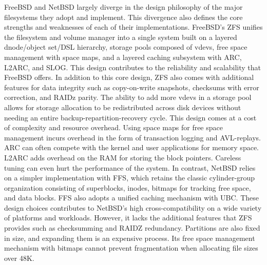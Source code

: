 FreeBSD and NetBSD largely diverge in the design philosophy of the major filesystems they adopt and implement. This divergence
also defines the core strengths and weaknesses of each of their implementations. FreeBSD's ZFS unifies the filesystem and volume
manager into a single system built on a layered dnode/object set/DSL hierarchy, storage pools composed of vdevs, free space
management with space maps, and a layered caching subsystem with ARC, L2ARC, and SLOG. This design contributes to the reliability
and scalability that FreeBSD offers. In addition to this core design, ZFS also comes with additional features for data integrity
such as copy-on-write snapshots, checksums with error correction, and RAIDz parity. The ability to add more vdevs in a storage
pool allows for storage allocation to be redistributed across disk devices without needing an entire backup-repartition-recovery
cycle. This design comes at a cost of complexity and resource overhead. Using space maps for free space management incurs overhead
in the form of transaction logging and AVL-replays. ARC can often compete with the kernel and user applications for memory space.
L2ARC adds overhead on the RAM for storing the block pointers. Careless tuning can even hurt the performance of the system. In
contrast, NetBSD relies on a simpler implementation with FFS, which retains the classic cylinder-group organization consisting of
superblocks, inodes, bitmaps for tracking free space, and data blocks. FFS also adopts a unified caching mechanism with UBC.
These design choices contributes to NetBSD's high cross-compatibility on a wide variety of platforms and workloads. However, it
lacks the additional features that ZFS provides such as checksumming and RAIDZ redundancy. Partitions are also fixed in size,
and expanding them is an expensive process. Its free space management mechanism with bitmaps cannot prevent fragmentation when
allocating file sizes over 48K.

